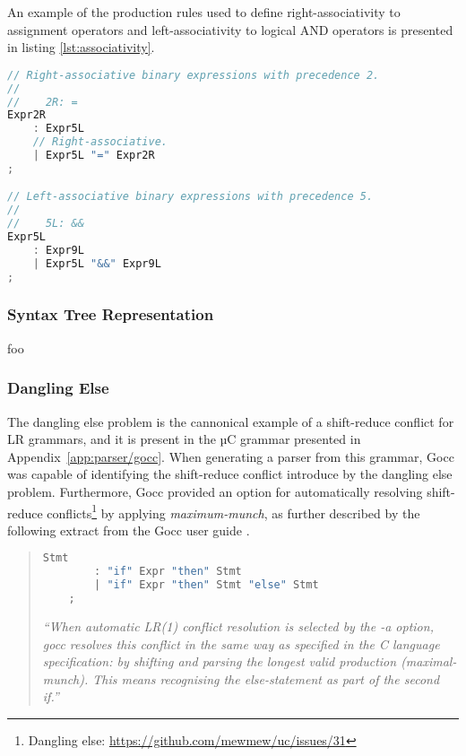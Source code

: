 An example of the production rules used to define right-associativity to assignment operators and left-associativity to logical AND operators is presented in listing \ref{lst:associativity}.

\begin{lstlisting}[language=go,style=go,caption={\label{lst:associativity}Associativity of binary expressions.}]
// Right-associative binary expressions with precedence 2.
//
//    2R: =
Expr2R
	: Expr5L
	// Right-associative.
	| Expr5L "=" Expr2R
;

// Left-associative binary expressions with precedence 5.
//
//    5L: &&
Expr5L
	: Expr9L
	| Expr5L "&&" Expr9L
;
\end{lstlisting}

\subsubsection{Syntax Tree Representation}



foo

\subsubsection{Dangling Else}

The dangling else problem is the cannonical example of a shift-reduce conflict for LR grammars, and it is present in the µC grammar presented in Appendix~\ref{app:parser/gocc}. When generating a parser from this grammar, Gocc was capable of identifying the shift-reduce conflict introduce by the dangling else problem. Furthermore, Gocc provided an option for automatically resolving shift-reduce conflicts\footnote{Dangling else: \url{https://github.com/mewmew/uc/issues/31}} by applying \textit{maximum-munch}, as further described by the following extract from the Gocc user guide \cite{gocc_user_guide}.

\begin{quote}
	\begin{lstlisting}[language=go,style=go,caption={Grammar with shift-reduce conflict.}]
	Stmt
		: "if" Expr "then" Stmt
		| "if" Expr "then" Stmt "else" Stmt
	;
	\end{lstlisting}

	\textit{``When automatic LR(1) conflict resolution is selected by the -a option, gocc resolves this conflict in the same way as specified in the C language specification: by shifting and parsing the longest valid production (maximal-munch). This means recognising the else-statement as part of the second if.''}
\end{quote}
